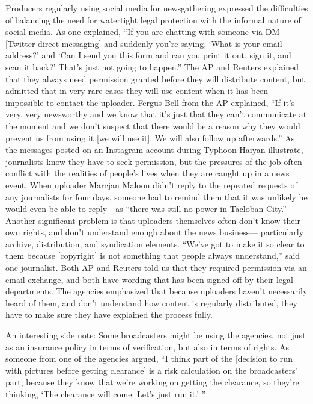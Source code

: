 \begin{enumerate}
Producers regularly using social media for newsgathering expressed the
difficulties of balancing the need for watertight legal protection with the
informal nature of social media. As one explained, ``If you are chatting with
someone via DM [Twitter direct messaging] and suddenly you're saying,
‘What is your email address?' and ‘Can I send you this form and can you
print it out, sign it, and scan it back?' That's just not going to happen.''
The AP and Reuters explained that they always need permission granted
before they will distribute content, but admitted that in very rare cases they
will use content when it has been impossible to contact the uploader. Fergus
Bell from the AP explained, ``If it's very, very newsworthy and we know that
it's just that they can't communicate at the moment and we don't suspect
that there would be a reason why they would prevent us from using it [we
will use it]. We will also follow up afterwards.''
As the messages posted on an Instagram account during Typhoon Haiyan
illustrate, journalists know they have to seek permission, but the pressures
of the job often conflict with the realities of people's lives when they are
caught up in a news event. When uploader Marcjan Maloon didn't reply
to the repeated requests of any journalists for four days, someone had to
remind them that it was unlikely he would even be able to reply—as ``there
was still no power in Tacloban City.''
Another significant problem is that uploaders themselves often don't know
their own rights, and don't understand enough about the news business—
particularly archive, distribution, and syndication elements. ``We've got to
make it so clear to them because [copyright] is not something that people
always understand,'' said one journalist.
Both AP and Reuters told us that they required permission via an email
exchange, and both have wording that has been signed off by their legal
departments. The agencies emphasized that because uploaders haven't necessarily
heard of them, and don't understand how content is regularly distributed,
they have to make sure they have explained the process fully.

An interesting side note: Some broadcasters might be using the agencies, not
just as an insurance policy in terms of verification, but also in terms of rights.
As someone from one of the agencies argued, ``I think part of the [decision to
run with pictures before getting clearance] is a risk calculation on the broadcasters'
part, because they know that we're working on getting the clearance,
so they're thinking, ‘The clearance will come. Let's just run it.' ''

\end{enumerate}
